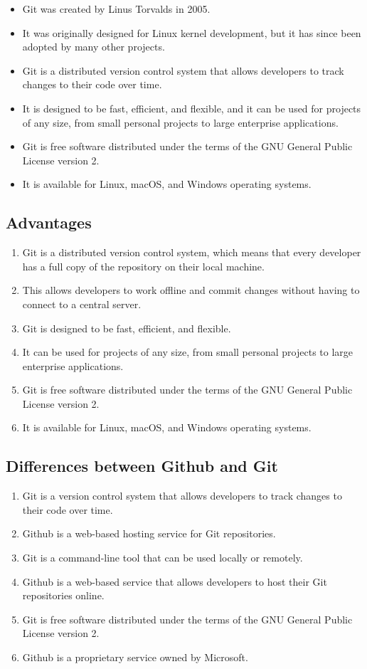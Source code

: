 \documentclass[11pt]{article}
\begin{document}
\begin{itemize}
    \item Git was created by Linus Torvalds in 2005.
    \item It was originally designed for Linux kernel development, but it has since been adopted by many other projects.
    \item Git is a distributed version control system that allows developers to track changes to their code over time.
    \item It is designed to be fast, efficient, and flexible, and it can be used for projects of any size, from small personal projects to large enterprise applications.
    \item Git is free software distributed under the terms of the GNU General Public License version 2.
    \item It is available for Linux, macOS, and Windows operating systems.
\end{itemize}
\subsection{Advantages}

\begin{enumerate}
    \item Git is a distributed version control system, which means that every developer has a full copy of the repository on their local machine.
    \item This allows developers to work offline and commit changes without having to connect to a central server.
    \item Git is designed to be fast, efficient, and flexible.
    \item It can be used for projects of any size, from small personal projects to large enterprise applications.
    \item Git is free software distributed under the terms of the GNU General Public License version 2.
    \item It is available for Linux, macOS, and Windows operating systems.
\end{enumerate}

\subsection{Differences between Github and Git}

\begin{enumerate}
    \item Git is a version control system that allows developers to track changes to their code over time.
    \item Github is a web-based hosting service for Git repositories.
    \item Git is a command-line tool that can be used locally or remotely.
    \item Github is a web-based service that allows developers to host their Git repositories online.
    \item Git is free software distributed under the terms of the GNU General Public License version 2.
    \item Github is a proprietary service owned by Microsoft.
\end{enumerate}
\end{document}
